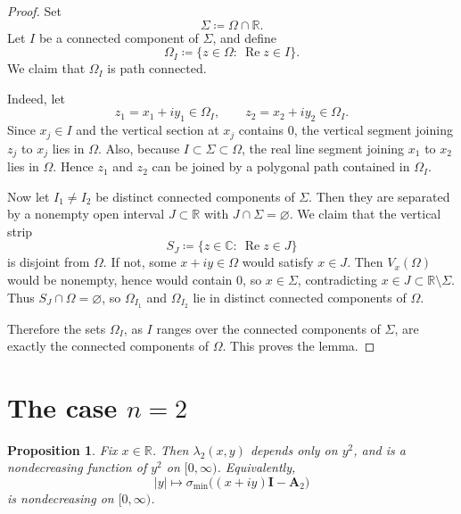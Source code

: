 \documentclass[11pt]{article}
\newtheorem{proposition}[theorem]{Proposition}
\newcommand{\C}{\mathbb{C}}
\newcommand{\R}{\mathbb{R}}
\begin{document}
\begin{proof}
Set
\[
\Sigma\coloneqq \Omega\cap\R.
\]
Let \(I\) be a connected component of \(\Sigma\), and define
\[
\Omega_I\coloneqq \{z\in\Omega:\ \operatorname{Re} z\in I\}.
\]
We claim that \(\Omega_I\) is path connected.

Indeed, let
\[
z_1=x_1+iy_1\in \Omega_I,
\qquad
z_2=x_2+iy_2\in \Omega_I.
\]
Since \(x_j\in I\) and the vertical section at \(x_j\) contains \(0\), the vertical segment
joining \(z_j\) to \(x_j\) lies in \(\Omega\). Also, because \(I\subset \Sigma\subset \Omega\),
the real line segment joining \(x_1\) to \(x_2\) lies in \(\Omega\). Hence \(z_1\) and \(z_2\)
can be joined by a polygonal path contained in \(\Omega_I\).

Now let \(I_1\neq I_2\) be distinct connected components of \(\Sigma\). Then they are separated by
a nonempty open interval \(J\subset\R\) with \(J\cap \Sigma=\varnothing\). We claim that the
vertical strip
\[
S_J\coloneqq \{z\in\C:\ \operatorname{Re} z\in J\}
\]
is disjoint from \(\Omega\). If not, some \(x+iy\in \Omega\) would satisfy \(x\in J\). Then
\(V_x(\Omega)\) would be nonempty, hence would contain \(0\), so \(x\in \Sigma\), contradicting
\(x\in J\subset \R\setminus\Sigma\). Thus \(S_J\cap\Omega=\varnothing\), so \(\Omega_{I_1}\) and
\(\Omega_{I_2}\) lie in distinct connected components of \(\Omega\).

Therefore the sets \(\Omega_I\), as \(I\) ranges over the connected components of \(\Sigma\), are
exactly the connected components of \(\Omega\). This proves the lemma.
\end{proof}

\section{The case \(n=2\)}

\begin{proposition}\label{prop:n2}
Fix \(x\in\R\). Then \(\lambda_2(x,y)\) depends only on \(y^2\), and is a nondecreasing function
of \(y^2\) on \([0,\infty)\). Equivalently,
\[
|y|\longmapsto \sigma_{\min}\!\bigl((x+iy)\mathbf I-\mathbf A_2\bigr)
\]
is nondecreasing on \([0,\infty)\).
\end{proposition}
\end{document}
